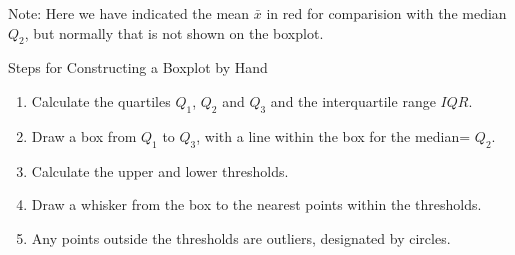 \documentclass[t,xcolor=pdftex,dvipsnames,table]{beamer}\usepackage[]{graphicx}\usepackage[]{color}
\begin{document}
\begin{frame}[fragile]{}
\vspace{1cm}

\vspace{.5cm}
Note: Here we have indicated the mean $\bar{x}$ in red for comparision with the median $Q_{2}$, but normally that is not shown on the boxplot.
\end{frame}

\begin{frame}[fragile]{Steps for Constructing a Boxplot by Hand}
\begin{enumerate}
\item Calculate the quartiles $Q_1$, $Q_2$ and $Q_3$ and the interquartile range $IQR$. 
\item Draw a box from $Q_1$ to $Q_3$, with a line within the box for the median= $Q_2$.
\item Calculate the upper and lower thresholds.
\item Draw a whisker from the box to the nearest points within the thresholds.
\item Any points outside the thresholds are outliers, designated by circles.
\end{enumerate}
\end{frame}
\end{document}
